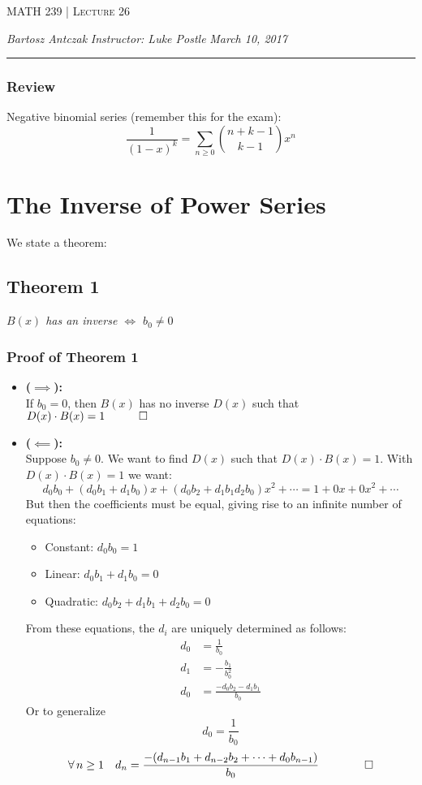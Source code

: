 \documentclass{report}
\newcommand{\lectureNum}{26}
\newcommand{\curDate}{March 10, 2017}
\newcommand{\course}{MATH 239}
\newcommand{\instructor}{Luke Postle}
\begin{document}
\begin{center}
\begin{Large}
\textsc{\course{} | Lecture \lectureNum{}}
\end{Large}
\end{center} 
\noindent \textit{Bartosz Antczak} \hfill
\textit{Instructor: \instructor{}} \hfill
\textit{\curDate{}}
\rule{\textwidth}{0.4pt}
\subsubsection{Review}
Negative binomial series (remember this for the exam):
$$\frac{1}{(1-x)^k} = \sum_{n \geq 0} {n+k - 1 \choose k-1}x^n$$
\section{The Inverse of Power Series}
We state a theorem:
\subsection{Theorem 1}
\begin{center}
\textit{$B(x)$ has an inverse $\iff$ $b_0 \neq 0$}
\end{center}
\subsubsection{Proof of Theorem 1}
\begin{itemize}
\item \textbf{($\implies$):}\\If $b_0 = 0$, then $B(x)$ has no inverse $D(x)$ such that $D(x) \cdot B(x) = 1 \quad \qed$
\item \textbf{($\impliedby$):}\\Suppose $b_0 \neq 0$. We want to find $D(x)$ such that $D(x) \cdot B(x) = 1$. With $D(x) \cdot B(x) = 1$ we want:
$$d_0b_0 + (d_0b_1 + d_1b_0)x + (d_0b_2 + d_1b_1 d_2b_0)x^2 + \cdots = 1 + 0x + 0x^2 + \cdots$$
But then the coefficients must be equal, giving rise to an infinite number of equations:
\begin{itemize}
\item Constant: $d_0b_0 = 1$
\item Linear: $d_0b_1 + d_1b_0 = 0$
\item Quadratic: $d_0b_2 + d_1b_1 + d_2b_0 = 0$
\end{itemize}
From these equations, the $d_i$ are uniquely determined as follows:
\begin{align*}
d_0 &= \frac{1}{b_0} \\
d_1 &= -\frac{b_1}{b_0^2} \\
d_0 &= \frac{-d_0b_2 - d_1b_1}{b_0}
\end{align*}
Or to generalize
$$d_0 = \frac{1}{b_0}$$
$$\forall \, n \geq 1 \quad d_n = \frac{-(d_{n-1}b_1 + d_{n-2}b_2 + \cdots + d_0b_{n-1})}{b_0} \qquad \qed$$
\end{itemize} 
\end{document}
